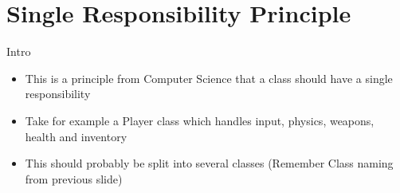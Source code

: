 \part{Single Responsibility Principle}
\frame{\partpage}

\begin{frame}{Intro}
	\begin{itemize}
		\pause \item This is a principle from Computer Science that a class should have a single responsibility
		\pause \item Take for example a Player class which handles input, physics, weapons, health and inventory
		\pause \item This should probably be split into several classes (Remember Class naming from previous slide)
	\end{itemize}
\end{frame}